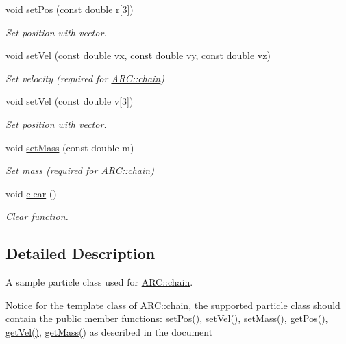 \begin{DoxyCompactItemize}
void \hyperlink{classParticle_ab3c50e74691f9264d4d4d2e72a6b9536}{set\+Pos} (const double r\mbox{[}3\mbox{]})
\begin{DoxyCompactList}\small\item\em Set position with vector. \end{DoxyCompactList}\item 
void \hyperlink{classParticle_a07c405254ac3f03854e7523ff473c828}{set\+Vel} (const double vx, const double vy, const double vz)
\begin{DoxyCompactList}\small\item\em Set velocity (required for \hyperlink{classARC_1_1chain}{A\+R\+C\+::chain}) \end{DoxyCompactList}\item 
void \hyperlink{classParticle_a433720a7673f9645e4e203c32435e301}{set\+Vel} (const double v\mbox{[}3\mbox{]})
\begin{DoxyCompactList}\small\item\em Set position with vector. \end{DoxyCompactList}\item 
void \hyperlink{classParticle_a620f479862b90468a77da4e9cf5c0ff5}{set\+Mass} (const double m)
\begin{DoxyCompactList}\small\item\em Set mass (required for \hyperlink{classARC_1_1chain}{A\+R\+C\+::chain}) \end{DoxyCompactList}\item 
void \hyperlink{classParticle_ab0eea4368ee797652c528949ab4ac563}{clear} ()
\begin{DoxyCompactList}\small\item\em Clear function. \end{DoxyCompactList}\end{DoxyCompactItemize}


\subsection{Detailed Description}
A sample particle class used for \hyperlink{classARC_1_1chain}{A\+R\+C\+::chain}. 

Notice for the template class of \hyperlink{classARC_1_1chain}{A\+R\+C\+::chain}, the supported particle class should contain the public member functions\+: \hyperlink{classParticle_a97d76b66aed57834c105b78b10643b81}{set\+Pos()}, \hyperlink{classParticle_a07c405254ac3f03854e7523ff473c828}{set\+Vel()}, \hyperlink{classParticle_a620f479862b90468a77da4e9cf5c0ff5}{set\+Mass()}, \hyperlink{classParticle_a4ec76421cddd91b1f27357fb182f6923}{get\+Pos()}, \hyperlink{classParticle_ab3d63df7f8c22f232b096ae33b6ea3ac}{get\+Vel()}, \hyperlink{classParticle_a2576aff503f68e78ced91406512b1255}{get\+Mass()} as described in the document 

